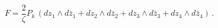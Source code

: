 \begin{equation}
F= \frac{2}{\zeta}P_k\,\left( dz_1\wedge d\bar{z}_1 +dz_2\wedge d\bar{z}_2
+ dz_3\wedge d\bar{z}_3 +dz_4\wedge d\bar{z}_4\right)\,.\label{eq:5.17}
\end{equation}

